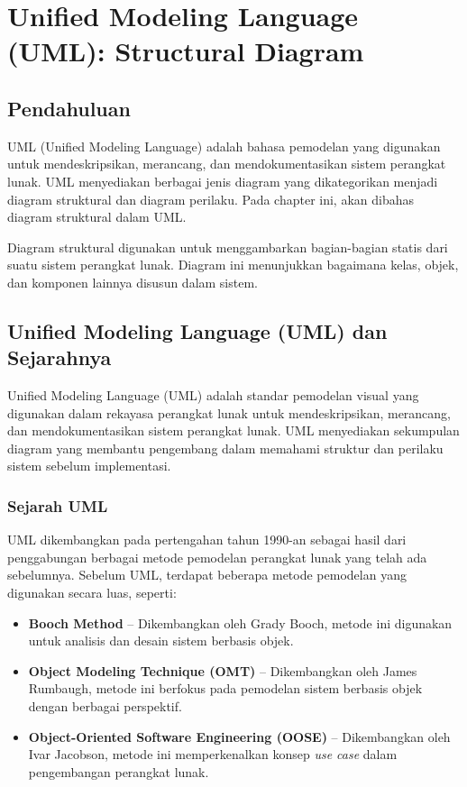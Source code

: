 \chapter{Unified Modeling Language (UML): Structural Diagram}

\section{Pendahuluan}
UML (Unified Modeling Language) adalah bahasa pemodelan yang digunakan untuk mendeskripsikan, merancang, dan mendokumentasikan sistem perangkat lunak. UML menyediakan berbagai jenis diagram yang dikategorikan menjadi diagram struktural dan diagram perilaku. Pada chapter ini, akan dibahas diagram struktural dalam UML.

Diagram struktural digunakan untuk menggambarkan bagian-bagian statis dari suatu sistem perangkat lunak. Diagram ini menunjukkan bagaimana kelas, objek, dan komponen lainnya disusun dalam sistem.


\section{Unified Modeling Language (UML) dan Sejarahnya}

Unified Modeling Language (UML) adalah standar pemodelan visual yang digunakan dalam rekayasa perangkat lunak untuk mendeskripsikan, merancang, dan mendokumentasikan sistem perangkat lunak. UML menyediakan sekumpulan diagram yang membantu pengembang dalam memahami struktur dan perilaku sistem sebelum implementasi.

\subsection{Sejarah UML}

UML dikembangkan pada pertengahan tahun 1990-an sebagai hasil dari penggabungan berbagai metode pemodelan perangkat lunak yang telah ada sebelumnya. Sebelum UML, terdapat beberapa metode pemodelan yang digunakan secara luas, seperti:
\begin{itemize}
	\item \textbf{Booch Method} – Dikembangkan oleh Grady Booch, metode ini digunakan untuk analisis dan desain sistem berbasis objek.
	\item \textbf{Object Modeling Technique (OMT)} – Dikembangkan oleh James Rumbaugh, metode ini berfokus pada pemodelan sistem berbasis objek dengan berbagai perspektif.
	\item \textbf{Object-Oriented Software Engineering (OOSE)} – Dikembangkan oleh Ivar Jacobson, metode ini memperkenalkan konsep \textit{use case} dalam pengembangan perangkat lunak.
\end{itemize}

